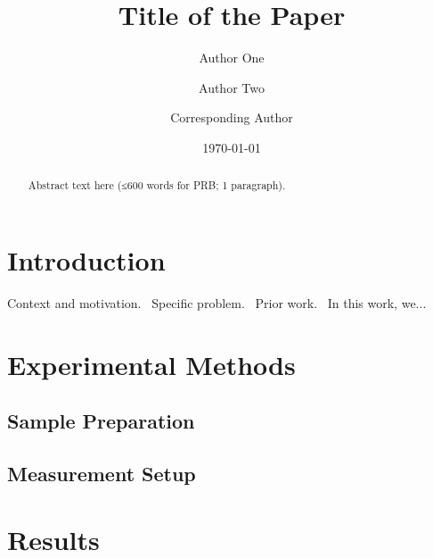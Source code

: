 \documentclass[aps,prb,twocolumn,showpacs,amsmath,amssymb,floatfix]{revtex4-2}
\begin{document}
\title{Title of the Paper}

\author{Author One}
\author{Author Two}
\author{Corresponding Author}

\date{\today}

\begin{abstract}
Abstract text here (≤600 words for PRB; 1 paragraph).
\end{abstract}


\maketitle

\section{\label{sec:intro}Introduction}

Context and motivation.~\cite{ref1}
Specific problem.~\cite{ref2,ref3}
Prior work.~\cite{ref4}
In this work, we...

\section{\label{sec:methods}Experimental Methods}

\subsection{Sample Preparation}

\subsection{Measurement Setup}

\section{\label{sec:results}Results}
\end{document}

